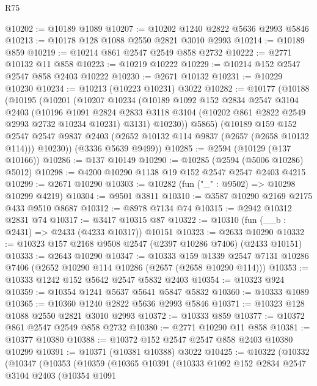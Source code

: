 \begin{lexlean}{R75}
\begin{coremodule}
@10202 := @10189 @1089
@10207 := @10202 @1240 @2822 @5636 @2993 @5846
@10213 := @10178 @128 @1088 @2550 @2821 @3010 @2993
@10214 := @10189 @859
@10219 := @10214 @861 @2547 @2549 @858 @2732
@10222 := @2771 @10132 @11 @858
@10223 := @10219 @10222
@10229 := @10214 @152 @2547 @2547 @858 @2403 @10222
@10230 := @2671 @10132
@10231 := @10229 @10230
@10234 := @10213 (@10223 @10231) @3022
@10282 := @10177
    (@10188
      (@10195
        (@10201
          (@10207
            @10234
            (@10189
              @1092
              @152
              @2834
              @2547
              @3104
              @2403
              (@10196
                @1091
                @2824
                @2833
                @3118
                @3104
                (@10202 @861 @2822 @2549 @2993 @2732 @10234 @10231)
                @3131)
              @10230))
          @5865)
        (@10189
          @159
          @152
          @2547
          @2547
          @9837
          @2403
          (@2652 @10132 @114 @9837 (@2657 (@2658 @10132 @114)))
          @10230))
      (@3336 @5639 @9499))
@10285 := @2594 (@10129 (@137 @10166))
@10286 := @137 @10149
@10290 := @10285 (@2594 (@5006 @10286) @5012)
@10298 := @4200 @10290 @1138 @19 @152 @2547 @2547 @2403 @4215
@10299 := @2671 @10290
@10303 := @10282 (fun ("_" : @9502) => @10298 @10299 @4219)
@10304 := @9501 @3811
@10310 := @3587 @10290 @2169 @2175 @433 @9510 @8687
@10312 := @8978 @7134 @74
@10315 := @2942 @10312 @2831 @74
@10317 := @3417 @10315 @87
@10322 := @10310 (fun (__b : @2431) => @2433 (@4233 @10317)) @10151
@10323 := @2633 @10290
@10332 := @10323 @157 @2168 @9508 @2547 (@2397 @10286 @7406) (@2433 @10151)
@10333 := @2643 @10290
@10347 := @10333
    @159
    @1339
    @2547
    @7131
    @10286
    @7406
    (@2652 @10290 @114 @10286 (@2657 (@2658 @10290 @114)))
@10353 := @10333 @1242 @152 @5642 @2547 @5832 @2403
@10354 := @10323 @924
@10359 := @10354 @1241 @5637 @5641 @5847 @5832
@10360 := @10333 @1089
@10365 := @10360 @1240 @2822 @5636 @2993 @5846
@10371 := @10323 @128 @1088 @2550 @2821 @3010 @2993
@10372 := @10333 @859
@10377 := @10372 @861 @2547 @2549 @858 @2732
@10380 := @2771 @10290 @11 @858
@10381 := @10377 @10380
@10388 := @10372 @152 @2547 @2547 @858 @2403 @10380 @10299
@10391 := @10371 (@10381 @10388) @3022
@10425 := @10322
    (@10332
      (@10347
        (@10353
          (@10359
            (@10365
              @10391
              (@10333
                @1092
                @152
                @2834
                @2547
                @3104
                @2403
                (@10354
                  @1091

\end{coremodule}
\end{lexlean}
